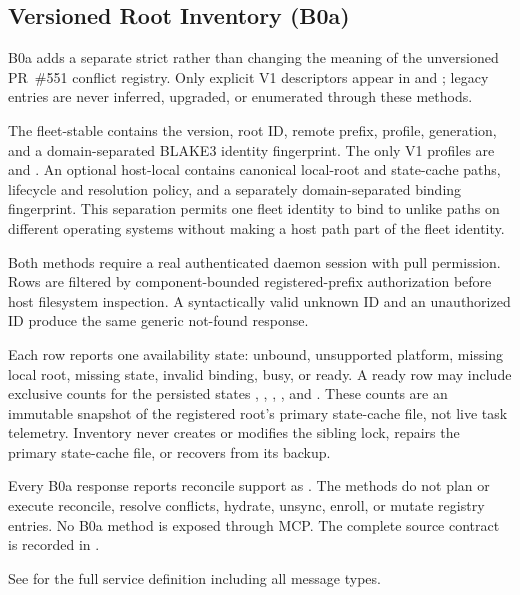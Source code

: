 \documentclass[11pt,a4paper]{article}
\begin{document}
\subsection{Versioned Root Inventory (B0a)}

B0a adds a separate strict  rather than changing the
meaning of the unversioned PR~\#551 conflict registry. Only explicit V1
descriptors appear in  and
; legacy  entries are never
inferred, upgraded, or enumerated through these methods.

The fleet-stable  contains the version, root ID, remote prefix,
profile, generation, and a domain-separated BLAKE3 identity fingerprint. The
only V1 profiles are  and . An optional
host-local  contains canonical local-root and state-cache
paths, lifecycle and resolution policy, and a separately domain-separated
binding fingerprint. This separation permits one fleet identity to bind to
unlike paths on different operating systems without making a host path part of
the fleet identity.

Both methods require a real authenticated daemon session with pull permission.
Rows are filtered by component-bounded registered-prefix authorization before
host filesystem inspection. A syntactically valid unknown ID and an
unauthorized ID produce the same generic not-found response.

Each row reports one availability state: unbound, unsupported platform,
missing local root, missing state, invalid binding, busy, or ready. A ready row
may include exclusive counts for the persisted states
, , , , and
. These counts are an immutable snapshot of the registered
root's primary state-cache file, not live task telemetry. Inventory never
creates or modifies the sibling lock, repairs the primary state-cache file, or
recovers from its backup.

Every B0a response reports reconcile support as . The methods do not
plan or execute reconcile, resolve conflicts, hydrate, unsync, enroll, or
mutate registry entries. No B0a method is exposed through MCP. The complete
source contract is recorded in
.

See  for the full service
definition including all message types.
\end{document}
